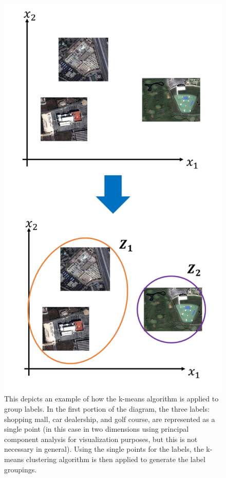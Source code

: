 \documentclass[../thesis.tex]{subfiles}
\begin{document}
\begin{figure}
    \centering
    \includegraphics[width=.8\linewidth]{images/ex-kmeans.pdf}
    \caption[K-means Based Label Grouping]{This depicts an example of how the k-means algorithm is applied to group labels. In the first portion of the diagram, the three labels: shopping mall, car dealership, and golf course, are represented as a single point (in this case in two dimensions using principal component analysis for visualization purposes, but this is not necessary in general). Using the single points for the labels, the k-means clustering algorithm is then applied to generate the label groupings.}
    \label{fig:ex-kmeans}
\end{figure}
\end{document}
